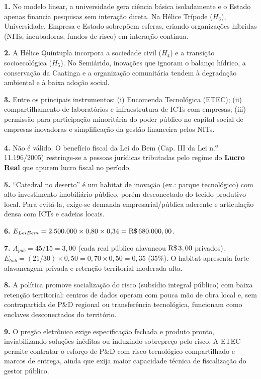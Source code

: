 \begin{boxGabarito}
\textbf{1.} No modelo linear, a universidade gera ciência básica isoladamente e o Estado apenas financia pesquisas sem interação direta. Na Hélice Trípode ($H_3$), Universidade, Empresa e Estado sobrepõem esferas, criando organizações híbridas (NITs, incubadoras, fundos de risco) em interação contínua.

\textbf{2.} A Hélice Quíntupla incorpora a sociedade civil ($H_4$) e a transição socioecológica ($H_5$). No Semiárido, inovações que ignoram o balanço hídrico, a conservação da Caatinga e a organização comunitária tendem à degradação ambiental e à baixa adoção social.

\textbf{3.} Entre os principais instrumentos: (i) Encomenda Tecnológica (ETEC); (ii) compartilhamento de laboratórios e infraestrutura de ICTs com empresas; (iii) permissão para participação minoritária do poder público no capital social de empresas inovadoras e simplificação da gestão financeira pelos NITs.

\textbf{4.} Não é válido. O benefício fiscal da Lei do Bem (Cap. III da Lei n.\textsuperscript{o} 11.196/2005) restringe-se a pessoas jurídicas tributadas pelo regime do \textbf{Lucro Real} que apurem lucro fiscal no período.

\textbf{5.} ``Catedral no deserto'' é um habitat de inovação (ex.: parque tecnológico) com alto investimento imobiliário público, porém desconectado do tecido produtivo local. Para evitá-la, exige-se demanda empresarial/pública aderente e articulação densa com ICTs e cadeias locais.

\textbf{6.} $E_{LeiBem} = 2.500.000 \times 0{,}80 \times 0{,}34 = \text{R\$\,}{680.000,00}$.

\textbf{7.} $A_{pub} = 45 / 15 = 3{,}00$ (cada real público alavancou $\text{R\$\,}{3,00}$ privados). $E_{hab} = (21/30) \times 0{,}50 = 0{,}70 \times 0{,}50 = 0{,}35$ ($35\%$). O habitat apresenta forte alavancagem privada e retenção territorial moderada-alta.

\textbf{8.} A política promove socialização do risco (subsídio integral público) com baixa retenção territorial: centros de dados operam com pouca mão de obra local e, sem contrapartida de P\&D regional ou transferência tecnológica, funcionam como enclaves desconectados do território.

\textbf{9.} O pregão eletrônico exige especificação fechada e produto pronto, inviabilizando soluções inéditas ou induzindo sobrepreço pelo risco. A ETEC permite contratar o esforço de P\&D com risco tecnológico compartilhado e marcos de entrega, ainda que exija maior capacidade técnica de fiscalização do gestor público.


\end{boxGabarito}
